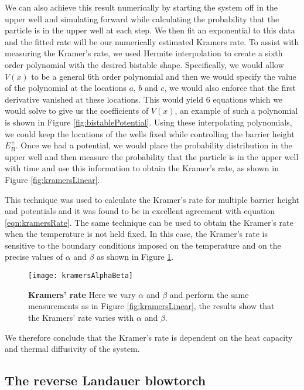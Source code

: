 We can also achieve this result numerically by starting the system off in the upper well and simulating forward while calculating the probability that the particle is in the upper well at each step. We then fit an exponential to this data and the fitted rate will be our numerically estimated Kramers rate. To assist with measuring the Kramer's rate, we used Hermite interpolation to create a sixth order polynomial with the desired bistable shape. Specifically, we would allow $V(x)$ to be a general 6th order polynomial and then we would specify the value of the polynomial at the locations $a$, $b$ and $c$, we would also enforce that the first derivative vanished at these locations. This would yield 6 equations which we would solve to give us the coefficients of $V(x)$, an example of such a polynomial is shown in Figure \ref{fig:bistablePotential}. Using these interpolating polynomials, we could keep the locations of the wells fixed while controlling the barrier height $E_B^+$. Once we had a potential, we would place the probability distribution in the upper well and then measure the probability that the particle is in the upper well with time and use this information to obtain the Kramer's rate, as shown in Figure \ref{fig:kramersLinear}.

This technique was used to calculate the Kramer's rate for multiple barrier height and potentials and it was found to be in excellent agreement with equation \ref{eqn:kramersRate}. The same technique can be used to obtain the Kramer's rate when the temperature is not held fixed. In this case, the Kramer's rate is sensitive to the boundary conditions imposed on the temperature and on the precise values of $\alpha$ and $\beta$ as shown in Figure \ref{fig:kramersAlphaBeta}.

\begin{figure}
	\center
	\texttt{[image: kramersAlphaBeta]}
	\caption{\textbf{Kramers' rate} Here we vary $\alpha$ and $\beta$ and perform the same measurements as in Figure \ref{fig:kramersLinear}, the results show that the Kramers' rate varies with $\alpha$ and $\beta$. \label{fig:kramersAlphaBeta}}
\end{figure}

We therefore conclude that the Kramer's rate is dependent on the heat capacity and thermal diffusivity of the system.

\subsection{The reverse Landauer blowtorch}


